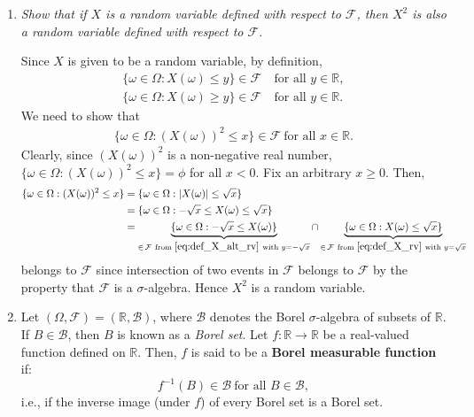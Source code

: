 \documentclass[11pt]{article}
\begin{document}
\begin{enumerate}
\item \emph{Show that if $X$ is a random variable defined with respect to $\mathcal{F}$, then $X^{2}$ is also a random variable defined with respect to $\mathcal{F}$.}

\par Since $X$ is given to be a random variable, by definition,
\begin{align}
\{\omega\in \Omega:X(\omega)\leq y\}\in \mathcal{F}~&\text{for all }y\in \mathbb{R},\label{eq:def_X_rv}\\
\{\omega\in \Omega:X(\omega)\geq y\}\in \mathcal{F}~&\text{for all }y\in \mathbb{R}.\label{eq:def_X_alt_rv}
\end{align}
We need to show that
\begin{eqnarray}
\{\omega\in \Omega:(X(\omega))^{2}\leq x\}\in \mathcal{F}~\text{for all }x\in \mathbb{R}.\label{eq:def_max_X2_rv}
\end{eqnarray}
Clearly, since $(X(\omega))^{2}$ is a non-negative real number, $\{\omega\in \Omega:(X(\omega))^{2}\leq x\}=\phi$ for all $x<0$. Fix an arbitrary $x\geq 0$. Then,
\begin{align}
\{\omega\in \Omega:(X(\omega))^{2}\leq x\}&=\{\omega\in \Omega:|X(\omega)|\leq \sqrt{x}\}\nonumber\\
                                          &=\{\omega\in \Omega:-\sqrt{x}\leq X(\omega) \leq \sqrt{x}\}\nonumber\\
                                          &=\underbrace{\{\omega\in \Omega:-\sqrt{x}\leq X(\omega)\}}_{\in\, \mathcal{F}~\text{from }\eqref{eq:def_X_alt_rv}~\text{with } y=-\sqrt{x}}\cap \underbrace{\{\omega\in \Omega:X(\omega) \leq \sqrt{x}\}}_{\in\, \mathcal{F}~\text{from }\eqref{eq:def_X_rv}~\text{with } y=\sqrt{x}}
\end{align}
belongs to $\mathcal{F}$ since intersection of two events in $\mathcal{F}$ belongs to $\mathcal{F}$ by the property that $\mathcal{F}$ is a $\sigma$-algebra. Hence $X^{2}$ is a random variable.

\item Let $(\Omega,\mathcal{F})=(\mathbb{R},\mathcal{B})$, where $\mathcal{B}$ denotes the Borel $\sigma$-algebra of subsets of $\mathbb{R}$. If $B\in \mathcal{B}$, then $B$ is known as a \emph{Borel set}. Let $f:\mathbb{R}\to \mathbb{R}$ be a real-valued function defined on $\mathbb{R}$. Then, $f$ is said to be a \textbf{Borel measurable function} if:
\begin{equation}
f^{-1}(B)\in \mathcal{B}~\text{for all }B\in \mathcal{B},
\end{equation}
i.e., if the inverse image (under $f$) of every Borel set is a Borel set.
\vspace{0.2cm}\\


\end{enumerate}
\end{document}

